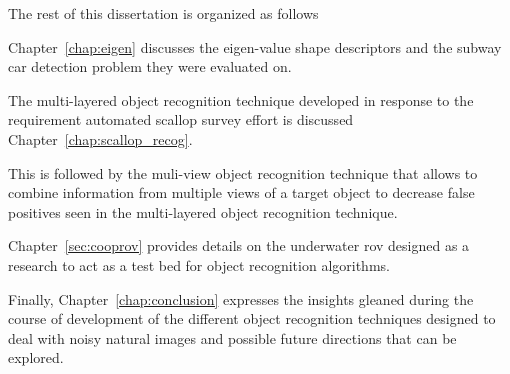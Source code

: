 \documentclass {udthesis}
\begin{document}
The rest of this dissertation is organized as follows 
\begin{enumerate*}[label=(\roman*)] 
  \item Chapter~\ref{chap:eigen} discusses the eigen-value shape descriptors and the subway car detection problem they were evaluated on.
  \item The multi-layered object recognition technique developed in response to the requirement automated scallop survey effort 
  is discussed Chapter~\ref{chap:scallop_recog}.
  \item This is followed by the muli-view object recognition technique that allows to combine information from multiple views 
  of a target object to decrease false positives seen in the multi-layered object recognition technique.
  \item Chapter~\ref{sec:cooprov} provides details on the underwater \gls{rov} designed as a research to act as a test bed for object recognition algorithms.
  \item Finally, Chapter~\ref{chap:conclusion} expresses the insights gleaned during the course of development of the different object recognition techniques designed to deal with noisy natural images and possible future directions that can be explored.
\end{enumerate*}

\printglossary[type=\acronymtype]                  
\end{document}
